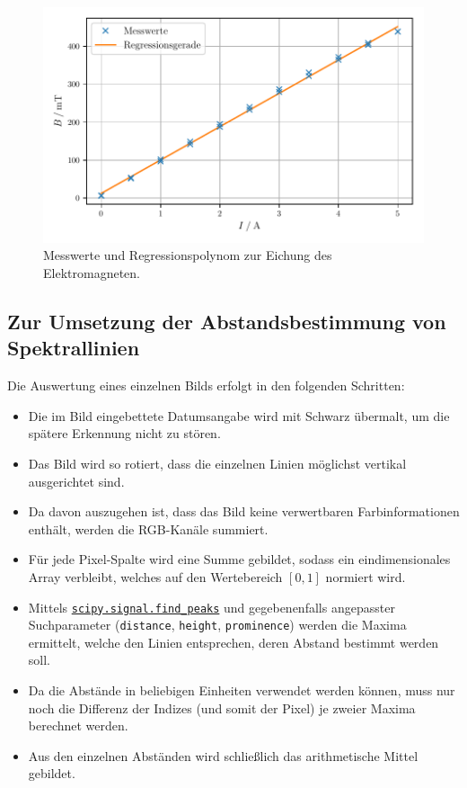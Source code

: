 \begin{figure}[H]
    \centering
    \includegraphics[width=\textwidth]{build/plt/1_magnet.pdf}
    \caption{Messwerte und Regressionspolynom zur Eichung des Elektromagneten.}
    \label{fig:plt:eichung}
\end{figure}

\subsection{Zur Umsetzung der Abstandsbestimmung von Spektrallinien}
Die Auswertung eines einzelnen Bilds erfolgt in den folgenden Schritten:
\begin{itemize}
    \item Die im Bild eingebettete Datumsangabe wird mit Schwarz übermalt, um die spätere Erkennung nicht zu stören.
    \item Das Bild wird so rotiert, dass die einzelnen Linien möglichst vertikal ausgerichtet sind.
    \item Da davon auszugehen ist, dass das Bild keine verwertbaren Farbinformationen enthält, werden die RGB-Kanäle summiert.
    \item Für jede Pixel-Spalte wird eine Summe gebildet, sodass ein eindimensionales Array verbleibt,
          welches auf den Wertebereich $[0, 1]$ normiert wird.
    \item Mittels \href{https://docs.scipy.org/doc/scipy/reference/generated/scipy.signal.find_peaks.html}{\texttt{scipy.signal.find\_peaks}}
          und gegebenenfalls angepasster Suchparameter (\texttt{distance}, \texttt{height}, \texttt{prominence})
          werden die Maxima ermittelt,
          welche den Linien entsprechen, deren Abstand bestimmt werden soll.
    \item Da die Abstände in beliebigen Einheiten verwendet werden können,
          muss nur noch die Differenz der Indizes (und somit der Pixel) je zweier Maxima berechnet werden.
    \item Aus den einzelnen Abständen wird schließlich das arithmetische Mittel gebildet.
\end{itemize}

